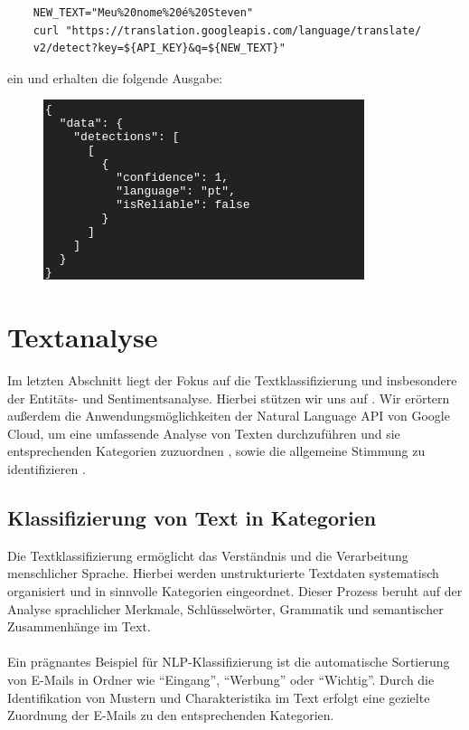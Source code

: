 \documentclass[12pt,a4paper]{article}
\begin{document}
\begin{verbatim}
	NEW_TEXT="Meu%20nome%20é%20Steven"
	curl "https://translation.googleapis.com/language/translate/
	v2/detect?key=${API_KEY}&q=${NEW_TEXT}"
\end{verbatim}
ein und erhalten die folgende Ausgabe:
\begin{figure}[h!]
	\centering
	\includegraphics[width=0.7\linewidth]{../images/result_port}
	\label{fig:resultport}
\end{figure}





\newpage
\section{Textanalyse}
Im letzten Abschnitt liegt der Fokus auf die Textklassifizierung und insbesondere der Entitäts- und Sentimentsanalyse. Hierbei stützen wir uns auf \cite{tunstall2022natural}. Wir erörtern außerdem die Anwendungsmöglichkeiten der Natural Language API von Google Cloud, um eine umfassende Analyse von Texten durchzuführen und sie entsprechenden Kategorien zuzuordnen \cite{classtext2023}, sowie die allgemeine Stimmung zu identifizieren \cite{entitysentiment2023}.
\subsection{Klassifizierung von Text in Kategorien}
Die Textklassifizierung ermöglicht das Verständnis und die Verarbeitung menschlicher Sprache. Hierbei werden unstrukturierte Textdaten systematisch organisiert und in sinnvolle Kategorien eingeordnet. Dieser Prozess beruht auf der Analyse sprachlicher Merkmale, Schlüsselwörter, Grammatik und semantischer Zusammenhänge im Text.
\\ \\
Ein prägnantes Beispiel für NLP-Klassifizierung ist die automatische Sortierung von E-Mails in Ordner wie \enquote{Eingang}, \enquote{Werbung} oder \enquote{Wichtig}. Durch die Identifikation von Mustern und Charakteristika im Text erfolgt eine gezielte Zuordnung der E-Mails zu den entsprechenden Kategorien.
\end{document}
